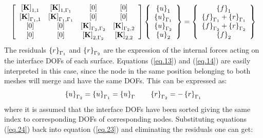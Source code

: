  \begin{equation}
 \label{eq.23}
     \left[ \begin{array}{cccc} 
     \left[{\mathbf{K}}\right]_{1,1} & \left[{\mathbf{K}}\right]_{1,\Gamma_1} & \left[{0}\right]& \left[{0}\right] \\
    \left[{\mathbf{K}}\right]_{\Gamma_1,1} & \left[{\mathbf{K}}\right]_{\Gamma_1,\Gamma_1} & \left[{0}\right]& \left[{0}\right]\\ \left[{0}\right]& \left[{0}\right]& \left[{\mathbf{K}}\right]_{\Gamma_2,\Gamma_2}&\left[{\mathbf{K}}\right]_{\Gamma_2,2}\\   
     \left[{0}\right] & \left[{0}\right]& \left[{\mathbf{K}}\right]_{2,\Gamma_2} & \left[{\mathbf{K}}\right]_{2,2}\end{array} \right] \left\lbrace \begin{array}{c} \left\lbrace{u}\right \rbrace_1\\\left\lbrace{u}\right \rbrace_{\Gamma_1}\\\left\lbrace{u}\right \rbrace_{\Gamma_2}\\\left\lbrace{u}\right \rbrace_2
     \end{array}\right\rbrace= \left\lbrace\begin{array}{c} \left\lbrace{f}\right \rbrace_1\\\left\lbrace{f}\right \rbrace_{\Gamma_1}+\left\lbrace{r}\right \rbrace_{\Gamma_1}\\\left\lbrace{f}\right \rbrace_{\Gamma_2}+\left\lbrace{r}\right \rbrace_{\Gamma_2}\\\left\lbrace{f}\right \rbrace_2
     \end{array}\right\rbrace
 \end{equation}
 The residuals $\left\lbrace{r}\right \rbrace_{\Gamma_1}$ and $\left\lbrace{r}\right \rbrace_{\Gamma_2}$ are the expression of the internal forces acting on the interface DOFs of each surface. Equations (\ref{eq.13}) and (\ref{eq.14}) are easily interpreted in this case, since the node in the same position belonging to both meshes will merge and have the same DOFs.
 This can be expressed as:
 \begin{eqnarray}
 \label{eq.24}
 \left\lbrace{u}\right \rbrace_{\Gamma_2}=\left\lbrace{u}\right \rbrace_{\Gamma_1} =\left\lbrace{u}\right \rbrace_{\Gamma} \qquad
 \label{eq.25}
 \left\lbrace{r}\right \rbrace_{\Gamma_2}=-\left\lbrace{r}\right \rbrace_{\Gamma_1}
 \end{eqnarray}
 where it is assumed that the interface DOFs have been sorted giving the same index to corresponding DOFs of corresponding nodes. Substituting equations (\ref{eq.24}) back into equation (\ref{eq.23}) and eliminating the residuals one can get:
